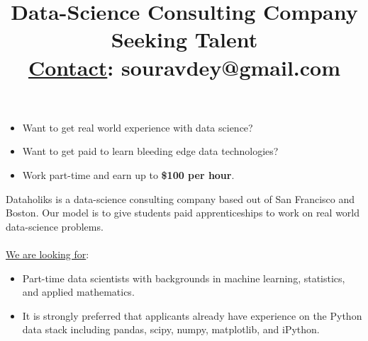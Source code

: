 \documentclass[11pt]{article}
\begin{document}

\begin{titlepage}


\thispagestyle{empty}

\vspace{-1in}

\title{\vspace{-0.5in} Data-Science Consulting Company Seeking Talent\\
	{\underline{Contact}: souravdey@gmail.com}}%
\date{}
\maketitle
%
\vspace{-0.75in}

\begin{itemize}
	\item Want to get real world experience with data science?
	\item Want to get paid to learn bleeding edge data technologies? 
	\item Work part-time and earn up to \textbf{\$100 per hour}.  
\end{itemize}

\noindent Dataholiks is a data-science consulting company based out of San Francisco and Boston. Our model is to give students paid apprenticeships to work on real world data-science problems. 
\\
\\
\noindent \underline{We are looking for}:
\begin{itemize}
	\item Part-time data scientists with backgrounds in machine learning, statistics, and applied mathematics.  
	\item It is strongly preferred that applicants already have experience on the Python data stack including pandas, scipy, numpy, matplotlib, and iPython. 
\end{itemize}


\end{titlepage}
\end{document}
